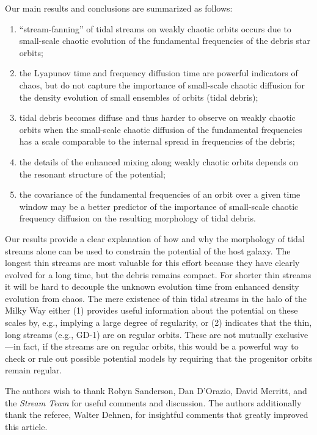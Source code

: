 \documentclass[letterpaper,12pt,preprint]{aastex}
\newcommand{\chchchanges}[1]{#1}
\begin{document}
Our main results and conclusions are summarized as follows:
\begin{enumerate}
	\item ``stream-fanning'' of tidal streams on weakly chaotic orbits \citep[as seen in simulations by][]{pearson15} occurs due to small-scale chaotic evolution of the fundamental frequencies of the debris star orbits;
	\item the Lyapunov time and frequency diffusion time are powerful indicators of chaos, but do not capture the importance of small-scale chaotic diffusion for the density evolution of small ensembles of orbits (tidal debris);
	\item tidal debris becomes diffuse and thus harder to observe on weakly chaotic orbits when the small-scale chaotic diffusion of the fundamental frequencies has a scale comparable to the internal spread in frequencies of the debris;
	\item the details of the enhanced mixing along weakly chaotic orbits depends on the resonant structure of the potential;
	\item the covariance of the fundamental frequencies of an orbit over a given time window may be a better predictor of the importance of small-scale chaotic frequency diffusion on the resulting morphology of tidal debris.
\end{enumerate}

Our results provide a clear explanation of how and why the morphology of tidal streams alone can be used to constrain the potential of the host galaxy. The longest thin streams are most valuable for this effort because they have clearly evolved for a long time, but the debris remains compact. For shorter thin streams it will be hard to decouple the unknown evolution time from enhanced density evolution from chaos. The mere existence of thin tidal streams in the halo of the Milky Way either (1) provides useful information about the potential on these scales by, e.g., implying a large degree of regularity, or (2) indicates that the thin, long streams (e.g., GD-1) are on regular orbits. These are not mutually exclusive---in fact, if the streams are on regular orbits, this would be a powerful way to check or rule out possible potential models by requiring that the progenitor orbits remain regular.

\acknowledgements
The authors wish to thank Robyn Sanderson, Dan D'Orazio, David Merritt, and the \emph{Stream Team} for useful comments and discussion. \chchchanges{The authors additionally thank the referee, Walter Dehnen, for insightful comments that greatly improved this article.}
\end{document}

